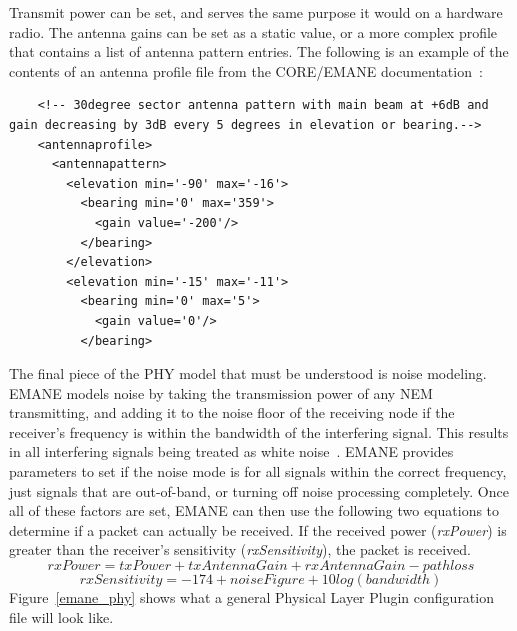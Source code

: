 Transmit power can be set, and serves the same purpose it would on a hardware radio.
The antenna gains can be set as a static value, or a more complex profile that contains a list of antenna pattern entries.
The following is an example of the contents of an antenna profile file from the CORE/EMANE documentation~\cite{core}:
\begin{center}
\begin{minipage}{\textwidth}
    \begin{verbatim}
    <!-- 30degree sector antenna pattern with main beam at +6dB and gain decreasing by 3dB every 5 degrees in elevation or bearing.-->
    <antennaprofile>
      <antennapattern>
        <elevation min='-90' max='-16'>
          <bearing min='0' max='359'>
            <gain value='-200'/>
          </bearing>
        </elevation>
        <elevation min='-15' max='-11'>
          <bearing min='0' max='5'>
            <gain value='0'/>
          </bearing>
    \end{verbatim}
\end{minipage}
\end{center}\par
The final piece of the PHY model that must be understood is noise modeling.
EMANE models noise by taking the transmission power of any NEM transmitting, and adding it to the noise floor of the receiving node if the receiver's frequency is within the bandwidth of the interfering signal.
This results in all interfering signals being treated as white noise~\cite{emane_phy}.
EMANE provides parameters to set if the noise mode is for all signals within the correct frequency, just signals that are out-of-band, or turning off noise processing completely.
Once all of these factors are set, EMANE can then use the following two equations to determine if a packet can actually be received.
If the received power (\textit{rxPower}) is greater than the receiver's sensitivity (\textit{rxSensitivity}), the packet is received.
\[ rxPower = txPower + txAntennaGain + rxAntennaGain - pathloss \]
\[ rxSensitivity = -174 + noiseFigure + 10log(bandwidth) \]
Figure~\ref{emane_phy} shows what a general Physical Layer Plugin configuration file will look like.\par

